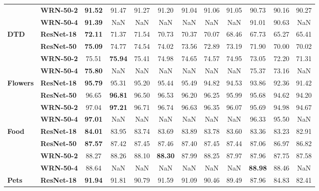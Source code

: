 \begin{table}
\begin{tabular}{l|l|cccccccccc}
       & \textbf{WRN-50-2} &             \textbf{91.52} & 91.47 & 91.27 & 91.20 & 91.04 & 91.06 & 91.05 & 90.73 & 90.16 & 90.27 \\
       & \textbf{WRN-50-4} &             \textbf{91.39} &   NaN &   NaN &   NaN &   NaN &   NaN &   NaN & 91.01 & 90.63 &   NaN \\
\cline{1-12}
\multirow{4}{*}{\textbf{DTD}} & \textbf{ResNet-18} &             \textbf{72.11} & 71.37 & 71.54 & 70.73 & 70.37 & 70.07 & 68.46 & 67.73 & 65.27 & 65.41 \\
       & \textbf{ResNet-50} &             \textbf{75.09} & 74.77 & 74.54 & 74.02 & 73.56 & 72.89 & 73.19 & 71.90 & 70.00 & 70.02 \\
       & \textbf{WRN-50-2} &             75.51 & \textbf{75.94} & 75.41 & 74.98 & 74.65 & 74.57 & 74.95 & 73.05 & 72.20 & 71.31 \\
       & \textbf{WRN-50-4} &             \textbf{75.80} &   NaN &   NaN &   NaN &   NaN &   NaN &   NaN & 75.37 & 73.16 &   NaN \\
\cline{1-12}
\multirow{4}{*}{\textbf{Flowers}} & \textbf{ResNet-18} &             \textbf{95.79} & 95.31 & 95.20 & 95.44 & 95.49 & 94.82 & 94.53 & 93.86 & 92.36 & 91.42 \\
       & \textbf{ResNet-50} &             96.65 & \textbf{96.81} & 96.50 & 96.53 & 96.20 & 96.25 & 95.99 & 95.68 & 94.62 & 94.20 \\
       & \textbf{WRN-50-2} &             97.04 & \textbf{97.21} & 96.71 & 96.74 & 96.63 & 96.35 & 96.07 & 95.69 & 94.98 & 94.67 \\
       & \textbf{WRN-50-4} &             \textbf{97.01} &   NaN &   NaN &   NaN &   NaN &   NaN &   NaN & 96.33 & 95.50 &   NaN \\
\cline{1-12}
\multirow{4}{*}{\textbf{Food}} & \textbf{ResNet-18} &             \textbf{84.01} & 83.95 & 83.74 & 83.69 & 83.89 & 83.78 & 83.60 & 83.36 & 83.23 & 82.91 \\
       & \textbf{ResNet-50} &             \textbf{87.57} & 87.42 & 87.45 & 87.46 & 87.40 & 87.45 & 87.44 & 87.06 & 86.97 & 86.82 \\
       & \textbf{WRN-50-2} &             88.27 & 88.26 & 88.10 & \textbf{88.30} & 87.99 & 88.25 & 87.97 & 87.96 & 87.75 & 87.58 \\
       & \textbf{WRN-50-4} &             88.64 &   NaN &   NaN &   NaN &   NaN &   NaN &   NaN & \textbf{88.98} & 88.46 &   NaN \\
\cline{1-12}
\multirow{4}{*}{\textbf{Pets}} & \textbf{ResNet-18} &             \textbf{91.94} & 91.81 & 90.79 & 91.59 & 91.09 & 90.46 & 89.49 & 87.96 & 84.83 & 82.41 \\

\end{tabular}
\end{table}
